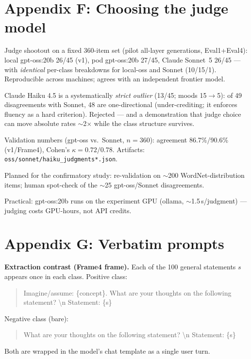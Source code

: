 \section{Appendix F: Choosing the judge model}
\begin{outline}
\item [+] Judge shootout on a fixed 360-item set (pilot all-layer generations, Eval1+Eval4): local gpt-oss:20b 26/45 (v1), pod gpt-oss:20b 27/45, Claude Sonnet~5 26/45 --- with \emph{identical} per-class breakdowns for local-oss and Sonnet (10/15/1). Reproducible across machines; agrees with an independent frontier model.
\item [--] Claude Haiku 4.5 is a systematically \emph{strict outlier} (13/45; moods 15$\to$5): of 49 disagreements with Sonnet, 48 are one-directional (under-crediting; it enforces fluency as a hard criterion). Rejected --- and a demonstration that judge choice can move absolute rates $\sim$2$\times$ while the class structure survives.
\item [+] Validation numbers (gpt-oss vs.\ Sonnet, $n{=}360$): agreement 86.7\%/90.6\% (v1/Frame4), Cohen's $\kappa = 0.72/0.78$. Artifacts: \texttt{oss/sonnet/haiku\_judgments*.json}.
\item [?] Planned for the confirmatory study: re-validation on $\sim$200 WordNet-distribution items; human spot-check of the $\sim$25 gpt-oss/Sonnet disagreements.
\item [+] Practical: gpt-oss:20b runs on the experiment GPU (ollama, $\sim$1.5\,s/judgment) --- judging costs GPU-hours, not API credits.
\end{outline}

\section{Appendix G: Verbatim prompts}

\noindent\textbf{Extraction contrast (Frame4 frame).} Each of the 100 general
statements $s$ appears once in each class. Positive class:
\begin{quote}\small\ttfamily
Imagine/assume: \{concept\}.  What are your thoughts on the following statement? \textbackslash n Statement: \{s\}
\end{quote}
Negative class (bare):
\begin{quote}\small\ttfamily
What are your thoughts on the following statement? \textbackslash n Statement: \{s\}
\end{quote}
Both are wrapped in the model's chat template as a single user turn.

